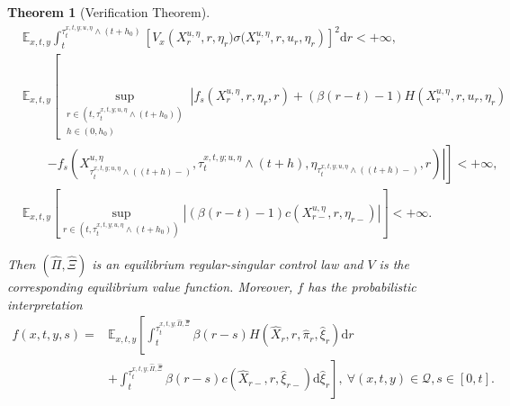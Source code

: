 \documentclass[10pt,a4paper]{amsart}
\newtheorem{theorem}{Theorem}
\begin{document}
\begin{theorem}[Verification Theorem]
\begin{align}
&\mathbb{E}_{x,t,y}\int_{t}^{\tau^{x,t,y;u,\eta}_{t}\wedge(t+h_0)}\left[V_{x}\left(X^{u,\eta}_{r},r,\eta_{r})\sigma(X^{u,\eta}_{r},r,u_r,\eta_{r}\right)\right]^{2}\mathrm{d}r<+\infty,\label{martingale2}\\
&\mathbb{E}_{x,t,y}\left[\sup\limits_{\substack{r\in(t,\tau^{x,t,y;u,\eta}_{t}\wedge(t+h_{0}))\\ h\in(0,h_{0})}}\left|f_s\left(X^{u,\eta}_{r},r,\eta_{r},r\right)+(\beta(r-t)-1) H\left(X^{u,\eta}_r, r,u_r, \eta_r \right)\right.\right.\nonumber\\
&\quad\quad\left.\left.-f_s\left(X^{u,\eta}_{\tau^{x,t,y;u,\eta}_{t}\wedge((t+h)-)},\tau^{x,t,y;u,\eta}_{t}\wedge(t+h),\eta_{\tau^{x,t,y;u,\eta}_{t}\wedge((t+h)-)},r\right)\right|\right]<+\infty,\label{integrability}\\
&\mathbb{E}_{x,t,y}\left[\sup\limits_{r\in(t,\tau^{x,t,y;u,\eta}_{t}\wedge(t+h_{0}))}\left|(\beta(r-t)-1)c\left(X^{u,\eta}_{r-},r,\eta_{r-}\right)\right|\right]<+\infty.\label{integrability2}
\end{align}%

Then $\left(\hat{\Pi},\hat{\Xi}\right)$ is an equilibrium regular-singular control law and $V$ is the corresponding equilibrium value function. Moreover, $f$ has the probabilistic interpretation
\begin{equation}
\begin{aligned}
\label{intf}
f(x,t,y,s)=&\mathbb{E}_{x,t,y}\left[\int_t^{\tau^{x,t,y;\hat{\Pi},\hat{\Xi}}_{t}} \beta(r-s) H\left(\hat{X}_r, r, \hat\pi_r, \hat{\xi}_r \right) \mathrm{d} r\right. \\
& \left.+\int_t^{\tau^{x,t,y;\hat{\Pi},\hat{\Xi}}_{t}} \beta(r-s) c\left(\hat{X}_{r-}, r, \hat{\xi}_{r-}\right) \mathrm{d} \hat{\xi}_r \right],\ \forall (x,t,y)\in\mathcal{Q}, s\in[0,t].
\end{aligned}
\end{equation}
\end{theorem}
\end{document}
